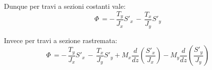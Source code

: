     Dunque per travi a sezioni costanti vale:
    \begin{equation*}
       \Phi\, = -\, \frac{T_y}{J_x}S'_x  \,-\, \frac{T_x}{J_y}S'_y 
    \end{equation*}

Invece per travi a sezione rastremata:
\begin{equation*}
       \Phi\, = -\, \frac{T_y}{J_x}S'_x  \,-\, \frac{T_x}{J_y}S'_y   + M_x \frac{d}{dz} \left(\frac{S'_x}{J_x} \right)-M_y\frac{d}{dz} \left(\frac{S'_y}{J_y} \right)
    \end{equation*}

    







